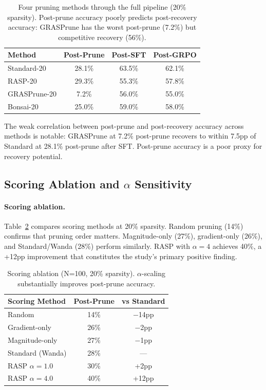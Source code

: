 \documentclass[11pt,a4paper]{article}
\begin{document}
\begin{table}[t]
\centering
\small
\begin{tabular}{lccc}
\toprule
\textbf{Method} & \textbf{Post-Prune} & \textbf{Post-SFT} & \textbf{Post-GRPO} \\
\midrule
Standard-20 & 28.1\% & 63.5\% & 62.1\% \\
RASP-20 & 29.3\% & 55.3\% & 57.8\% \\
GRASPrune-20 & 7.2\% & 56.0\% & 55.0\% \\
Bonsai-20 & 25.0\% & 59.0\% & 58.0\% \\
\bottomrule
\end{tabular}
\caption{Four pruning methods through the full pipeline (20\% sparsity). Post-prune accuracy poorly predicts post-recovery accuracy: GRASPrune has the worst post-prune (7.2\%) but competitive recovery (56\%).}
\label{tab:baselines}
\end{table}

The weak correlation between post-prune and post-recovery accuracy across methods is notable: GRASPrune at 7.2\% post-prune recovers to within 7.5pp of Standard at 28.1\% post-prune after SFT. Post-prune accuracy is a poor proxy for recovery potential.


\subsection{Scoring Ablation and $\alpha$ Sensitivity}
\label{sec:ablation}

\paragraph{Scoring ablation.}
Table~\ref{tab:scoring} compares scoring methods at 20\% sparsity. Random pruning (14\%) confirms that pruning order matters. Magnitude-only (27\%), gradient-only (26\%), and Standard/Wanda (28\%) perform similarly. RASP with $\alpha{=}4$ achieves 40\%, a +12pp improvement that constitutes the study's primary positive finding.

\begin{table}[t]
\centering
\small
\begin{tabular}{lcc}
\toprule
\textbf{Scoring Method} & \textbf{Post-Prune} & \textbf{vs Standard} \\
\midrule
Random & 14\% & $-$14pp \\
Gradient-only & 26\% & $-$2pp \\
Magnitude-only & 27\% & $-$1pp \\
Standard (Wanda) & 28\% & --- \\
RASP $\alpha{=}1.0$ & 30\% & +2pp \\
RASP $\alpha{=}4.0$ & 40\% & +12pp \\
\bottomrule
\end{tabular}
\caption{Scoring ablation (N=100, 20\% sparsity). $\alpha$-scaling substantially improves post-prune accuracy.}
\label{tab:scoring}
\end{table}
\end{document}
